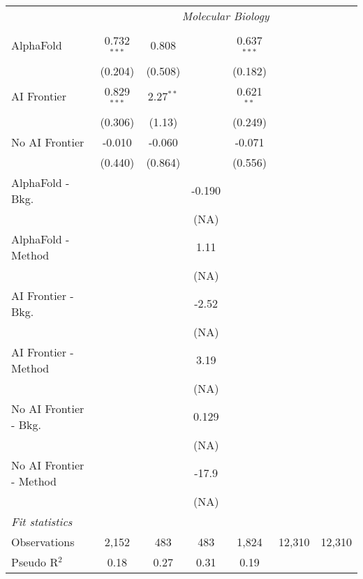 \begin{tabular}{lcccccc}
 & \multicolumn{6}{c}{\textit{Molecular Biology}} \\ \\
   AlphaFold               & 0.732$^{***}$ & 0.808       &           & 0.637$^{***}$ &        &   \\   
                           & (0.204)       & (0.508)     &           & (0.182)       &        &   \\   
   AI Frontier             & 0.829$^{***}$ & 2.27$^{**}$ &           & 0.621$^{**}$  &        &   \\   
                           & (0.306)       & (1.13)      &           & (0.249)       &        &   \\   
   No AI Frontier          & -0.010        & -0.060      &           & -0.071        &        &   \\   
                           & (0.440)       & (0.864)     &           & (0.556)       &        &   \\   
   AlphaFold - Bkg.        &               &             & -0.190    &               &        &   \\   
                           &               &             & (NA)      &               &        &   \\   
   AlphaFold - Method      &               &             & 1.11      &               &        &   \\   
                           &               &             & (NA)      &               &        &   \\   
   AI Frontier - Bkg.      &               &             & -2.52     &               &        &   \\   
                           &               &             & (NA)      &               &        &   \\   
   AI Frontier - Method    &               &             & 3.19      &               &        &   \\   
                           &               &             & (NA)      &               &        &   \\   
   No AI Frontier - Bkg.   &               &             & 0.129     &               &        &   \\   
                           &               &             & (NA)      &               &        &   \\   
   No AI Frontier - Method &               &             & -17.9     &               &        &   \\   
                           &               &             & (NA)      &               &        &   \\   
   \midrule
   \emph{Fit statistics}\\
   Observations            & 2,152         & 483         & 483       & 1,824         & 12,310 & 12,310\\  
   Pseudo R$^2$            & 0.18          & 0.27        & 0.31      & 0.19          &        & \\  
   

\end{tabular}

